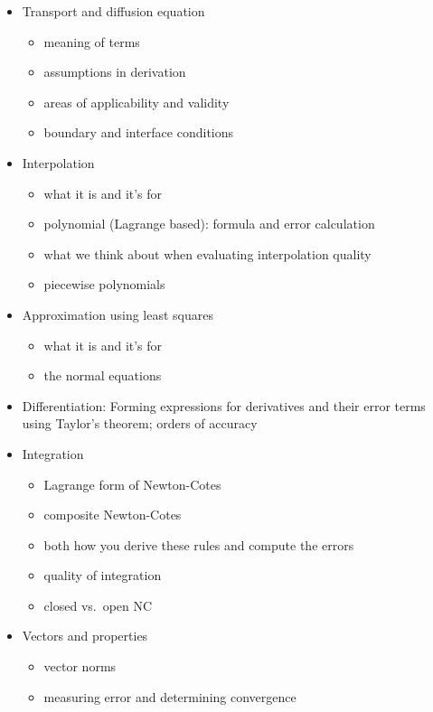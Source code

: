 \documentclass[12pt]{article}
\begin{document}
\begin{itemize}
\item Transport and diffusion equation
  \begin{itemize}
  \item meaning of terms
  \item assumptions in derivation
  \item areas of applicability and validity
  \item boundary and interface conditions
  \end{itemize}

\item Interpolation 
  \begin{itemize}
  \item what it is and it's for  
  \item polynomial (Lagrange based): formula and error calculation 
  \item what we think about when evaluating interpolation quality
  \item piecewise polynomials
  \end{itemize}

\item Approximation using least squares
  \begin{itemize}
  \item what it is and it's for  
  \item the normal equations
  \end{itemize}

\item Differentiation: Forming expressions for derivatives and their error terms using Taylor's theorem; orders of accuracy

\item Integration
  \begin{itemize}
  \item Lagrange form of Newton-Cotes
  \item composite Newton-Cotes
  \item both how you derive these rules and compute the errors
  \item quality of integration
  \item closed vs.\ open NC
  \end{itemize}

\item Vectors and properties
  \begin{itemize}
  \item vector norms
  \item measuring error and determining convergence
  \end{itemize}


\end{itemize}
\end{document}
